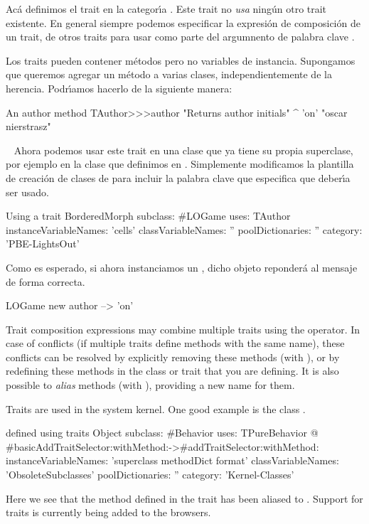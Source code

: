 \documentclass[a4paper,10pt,twoside]{book}
\begin{document}
\noindent
Ac\'a definimos el trait  en la categor\'\i{}a .
Este trait no \emph{usa} ning\'un otro trait existente.
En general siempre podemos especificar la expresi\'on de composici\'on de un trait, de otros traits para usar como parte del argumnento de palabra clave .


Los traits pueden contener m\'etodos pero no variables de instancia.
Supongamos que queremos agregar un m\'etodo  a varias clases, independientemente de la herencia. 
Podr\'\i{}amos hacerlo de la siguiente manera:


\begin{method}[author]{An author method}
TAuthor>>>author
    "Returns author initials"
	^ 'on'    "oscar nierstrasz"
\end{method}

\
\noindent
Ahora podemos usar este trait en una clase que ya tiene su propia superclase, por ejemplo en la clase  que definimos en .
Simplemente modificamos la plantilla de creaci\'on de clases de  \ct{LOGame} para incluir la palabra clave  \ct{uses:}  que especifica que  deber\'\i{}a ser usado.



\begin{classdef}[sbegamewithtrait]{Using a trait}
BorderedMorph subclass: #LOGame
	uses: TAuthor
	instanceVariableNames: 'cells'
	classVariableNames: ''
	poolDictionaries: ''
	category: 'PBE-LightsOut'
\end{classdef}

Como es esperado, si ahora instanciamos un , dicho objeto reponder\'a al mensaje    de forma correcta.

\begin{code}{}
LOGame new author --> 'on'
\end{code}

Trait composition expressions may combine multiple traits using the \ct{+} operator.
In case of conflicts (\ie if multiple traits define methods with the same name), these conflicts can be resolved by explicitly removing these methods (with \ct{-}), or by redefining these methods in the class or trait that you are defining.
It is also possible to \emph{alias} methods (with \ct{@}), providing a new name for them.

Traits are used in the system kernel.
One good example is the class \mbox{.}

\begin{classdef}[behaviorwithtraits]{ defined using traits}
Object subclass: #Behavior
	uses: TPureBehavior @ {#basicAddTraitSelector:withMethod:->#addTraitSelector:withMethod:}
	instanceVariableNames: 'superclass methodDict format'
	classVariableNames: 'ObsoleteSubclasses'
	poolDictionaries: ''
	category: 'Kernel-Classes'
\end{classdef}
\noindent
Here we see that the method  defined in the trait  has been aliased to .
Support for traits is currently being added to the browsers.
\end{document}
